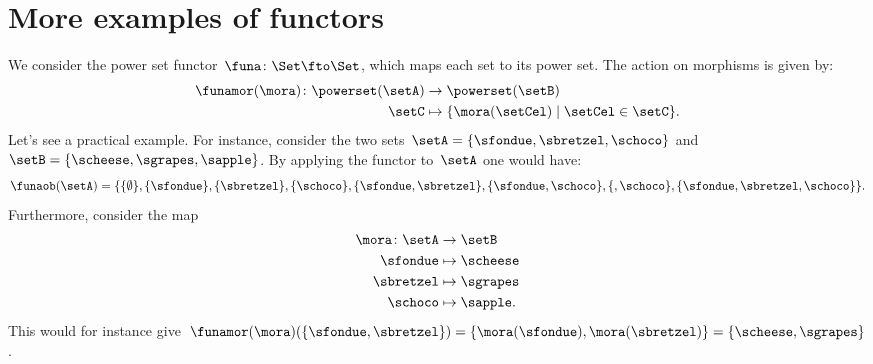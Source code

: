 
\section{More examples of functors}

\begin{example}
    \label{ex:powerset_functor}
    We consider the power set functor~$\funa\colon \Set \fto \Set$, which maps each set to its power set.
    The action on morphisms is given by:
    \begin{equation*}
        \begin{aligned}
            \funamor(\mora)\colon \powerset(\setA) & \to \powerset(\setB)                               \\
            \setC                                  & \mapsto \{\mora(\setCel) \mid \setCel \in \setC\}.
        \end{aligned}
    \end{equation*}
    Let's see a practical example.
    For instance, consider the two sets~$\setA=\{\sfondue,\sbretzel,\schoco\}$ and~$\setB=\{\scheese,\sgrapes,\sapple\}$.
    By applying the functor to~$\setA$ one would have:
    \begin{equation*}
        \funaob(\setA)=\{\{\emptyset\}, \{\sfondue\}, \{\sbretzel\}, \{\schoco\}, \{\sfondue,\sbretzel\}, \{\sfondue,\schoco\}, \{,\schoco\}, \{\sfondue,\sbretzel,\schoco\}\}.
    \end{equation*}
    Furthermore, consider the map
    \begin{equation*}
        \begin{aligned}
            \mora \colon \setA & \to \setB        \\
            \sfondue           & \mapsto \scheese \\
            \sbretzel          & \mapsto \sgrapes \\
            \schoco            & \mapsto \sapple.
        \end{aligned}
    \end{equation*}
    This would for instance give~$\funamor(\mora)(\{\sfondue,\sbretzel\})=\{\mora(\sfondue),\mora(\sbretzel)\}=\{\scheese,\sgrapes\}$.


\end{example}

